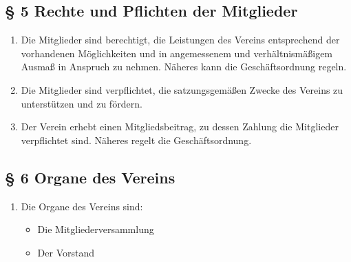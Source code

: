 ﻿\documentclass[10pt,a4paper]{scrartcl}
\begin{document}
\subsection*{§ 5 Rechte und Pflichten der Mitglieder}
\begin{enumerate}
	\item Die Mitglieder sind berechtigt, die Leistungen des Vereins entsprechend der vorhandenen
		Möglichkeiten und in angemessenem und verhältnismäßigem Ausmaß in Anspruch zu nehmen.
                Nä\-he\-res kann die Geschäftsordnung regeln.
	\item Die Mitglieder sind verpflichtet, die satzungsgemäßen Zwecke des Vereins zu unterstützen
		und zu fördern.
	\item Der Verein erhebt einen Mitgliedsbeitrag, zu dessen Zahlung die Mitglieder verpflichtet
		sind. Näheres regelt die Geschäftsordnung.
        
\end{enumerate}
%
%
\subsection*{§ 6 Organe des Vereins }
\begin{enumerate}
	\item Die Organe des Vereins sind:
		\begin{itemize}
			\item Die Mitgliederversammlung
			\item Der Vorstand
		\end{itemize}
\end{enumerate}
%
%
\end{document}
